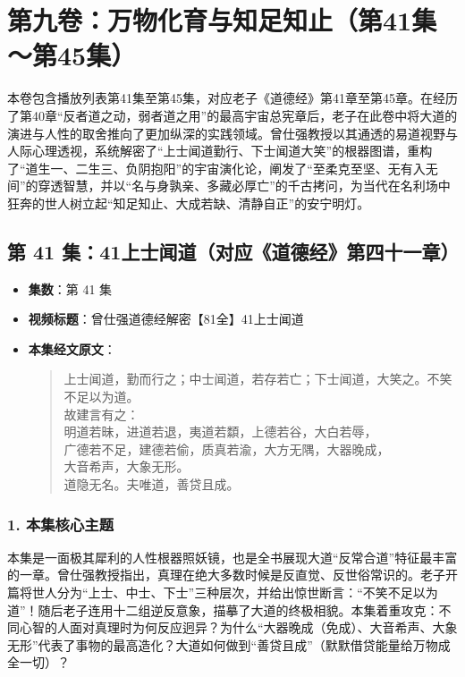 \section*{第九卷：万物化育与知足知止（第41集～第45集）}

本卷包含播放列表第41集至第45集，对应老子《道德经》第41章至第45章。在经历了第40章“反者道之动，弱者道之用”的最高宇宙总宪章后，老子在此卷中将大道的演进与人性的取舍推向了更加纵深的实践领域。曾仕强教授以其通透的易道视野与人际心理透视，系统解密了“上士闻道勤行、下士闻道大笑”的根器图谱，重构了“道生一、二生三、负阴抱阳”的宇宙演化论，阐发了“至柔克至坚、无有入无间”的穿透智慧，并以“名与身孰亲、多藏必厚亡”的千古拷问，为当代在名利场中狂奔的世人树立起“知足知止、大成若缺、清静自正”的安宁明灯。

\clearpage

\subsection{第 41 集：41上士闻道（对应《道德经》第四十一章）}
\label{sec:ep41}

\begin{itemize}
    \item \textbf{集数}：第 41 集
    \item \textbf{视频标题}：曾仕强道德经解密【81全】41上士闻道
    
    \item \textbf{本集经文原文}：
    \begin{quote}\kaishu
    上士闻道，勤而行之；中士闻道，若存若亡；下士闻道，大笑之。不笑不足以为道。\\
    故建言有之：\\
    明道若昧，进道若退，夷道若纇，上德若谷，大白若辱，\\
    广德若不足，建德若偷，质真若渝，大方无隅，大器晚成，\\
    大音希声，大象无形。\\
    道隐无名。夫唯道，善贷且成。
    \end{quote}
\end{itemize}

\subsubsection{1. 本集核心主题}
本集是一面极其犀利的人性根器照妖镜，也是全书展现大道“反常合道”特征最丰富的一章。曾仕强教授指出，真理在绝大多数时候是反直觉、反世俗常识的。老子开篇将世人分为“上士、中士、下士”三种层次，并给出惊世断言：“不笑不足以为道”！随后老子连用十二组逆反意象，描摹了大道的终极相貌。本集着重攻克：不同心智的人面对真理时为何反应迥异？为什么“大器晚成（免成）、大音希声、大象无形”代表了事物的最高造化？大道如何做到“善贷且成”（默默借贷能量给万物成全一切）？

